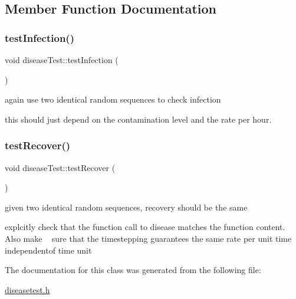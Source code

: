 \subsection{Member Function Documentation}
\mbox{\label{classdiseaseTest_ac6ddc9154b76e19798cd72c144d67c53}} 
\subsubsection{\texorpdfstring{test\+Infection()}{testInfection()}}
{\footnotesize\ttfamily void disease\+Test\+::test\+Infection (\begin{DoxyParamCaption}{ }\end{DoxyParamCaption})\hspace{0.3cm}{\ttfamily [inline]}}



again use two identical random sequences to check infection 

this should just depend on the contamination level and the rate per hour. \mbox{\label{classdiseaseTest_af072ce110dc0cb4e4dfd7938e03e01f4}} 
\subsubsection{\texorpdfstring{test\+Recover()}{testRecover()}}
{\footnotesize\ttfamily void disease\+Test\+::test\+Recover (\begin{DoxyParamCaption}{ }\end{DoxyParamCaption})\hspace{0.3cm}{\ttfamily [inline]}}



given two identical random sequences, recovery should be the same 

explcitly check that the function call to disease matches the function content. Also make ~\newline
sure that the timestepping guarantees the same rate per unit time independentof time unit 

The documentation for this class was generated from the following file\+:\begin{DoxyCompactItemize}
\item 
\mbox{\hyperlink{diseasetest_8h}{diseasetest.\+h}}\end{DoxyCompactItemize}
